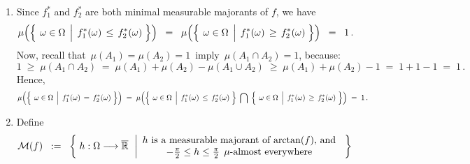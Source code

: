 \begin{enumerate}
\item
	Since $f^{*}_{1}$ and $f^{*}_{2}$ are both minimal measurable majorants of $f$,
	we have
	\begin{equation*}
	\mu\!\left(\left\{\;
		\left.
		\omega \overset{{\color{white}.}}{\in} \Omega
		\;\,\right\vert\;
		f^{*}_{1}(\omega) \, \leq \, f^{*}_{2}(\omega) 
		\;\right\}\right)
	\;\; = \;\;
	\mu\!\left(\left\{\;
		\left.
		\omega \overset{{\color{white}.}}{\in} \Omega
		\;\,\right\vert\;
		f^{*}_{1}(\omega) \, \geq \, f^{*}_{2}(\omega) 
		\;\right\}\right)
	\;\; = \;\; 1\,.
	\end{equation*}
	Now, recall that \,$\mu(A_{1}) = \mu(A_{2}) = 1$\, imply \,$\mu(A_{1} \cap A_{2}) = 1$, because:
	\begin{equation*}
	1 \;\geq\; \mu(A_{1} \cap A_{2})
	\;=\; \mu(A_{1}) + \mu(A_{2}) - \mu(A_{1} \cup A_{2})
	\;\geq\; \mu(A_{1}) + \mu(A_{2}) - 1
	\;=\; 1 + 1 - 1 \;=\; 1\,.
	\end{equation*}
	Hence,
	\begin{equation*}
	\mu\!\left(\left\{\;
		\left.
		\omega \overset{{\color{white}.}}{\in} \Omega
		\;\,\right\vert\;
		f^{*}_{1}(\omega) \, = \, f^{*}_{2}(\omega) 
		\;\right\}\right)
	\; = \;
	\mu\!\left(
		\left\{\;
		\left.
		\omega \overset{{\color{white}.}}{\in} \Omega
		\;\,\right\vert\;
		f^{*}_{1}(\omega) \, \leq \, f^{*}_{2}(\omega) 
		\;\right\}
	\;\bigcap\;
		\left\{\;
		\left.
		\omega \overset{{\color{white}.}}{\in} \Omega
		\;\,\right\vert\;
		f^{*}_{1}(\omega) \, \geq \, f^{*}_{2}(\omega) 
		\;\right\}
	\right)
	\; = \; 1\,.
	\end{equation*}
\item
	Define
	\begin{equation*}
	\mathcal{M}(f)
	\;\; := \;\;
		\left\{\;
			h : \Omega \longrightarrow \overline{\Re}
		\;\,\left\vert
			\begin{array}{c}
			\textnormal{$h$ is a measurable majorant of $\arctan(f)$, and}
			\\
			-\frac{\pi}{2} \leq h \leq \frac{\pi}{2} \;\, \mu\textnormal{-almost everywhere}
			\end{array}
		\right.
		\;\right\}
	\end{equation*}


\end{enumerate}
